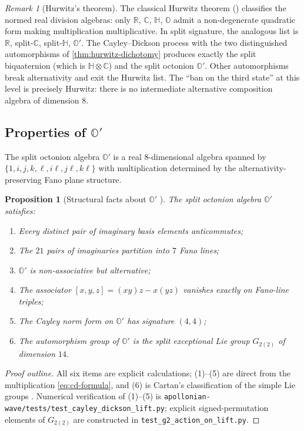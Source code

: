 \documentclass[11pt,a4paper]{article}
\theoremstyle{plain}
\newtheorem{proposition}[theorem]{Proposition}
\theoremstyle{definition}
\theoremstyle{remark}
\newtheorem{remark}[theorem]{Remark}
\numberwithin{equation}{section}
\providecommand{\R}{\mathbb{R}}
\providecommand{\C}{\mathbb{C}}
\providecommand{\HH}{\mathbb{H}}
\providecommand{\OO}{\mathbb{O}}
\providecommand{\Os}{\mathbb{O}'}
\begin{document}
\begin{remark}[Hurwitz's theorem]
\label{rmk:hurwitz}
The classical Hurwitz theorem (\cite{hurwitz1898,baez-octonions})
classifies the normed real division algebras: only $\R$, $\C$,
$\HH$, $\OO$ admit a non-degenerate quadratic form making
multiplication multiplicative.  In split signature, the analogous
list is $\R$, split-$\C$, split-$\HH$, $\Os$.  The
Cayley--Dickson process with the two distinguished automorphisms
of \cref{thm:hurwitz-dichotomy} produces exactly the split
biquaternion (which is $\HH \otimes \C$) and the split octonion
$\Os$.  Other automorphisms break alternativity and exit the
Hurwitz list.  The ``ban on the third state'' at this level is
precisely Hurwitz: there is no intermediate alternative
composition algebra of dimension $8$.
\end{remark}

\subsection{Properties of \texorpdfstring{$\Os$}{O'}}

The split octonion algebra $\Os$ is a real $8$-dimensional algebra
spanned by $\{1, i, j, k, \ell, i\ell, j\ell, k\ell\}$ with
multiplication determined by the alternativity-preserving Fano
plane structure.

\begin{proposition}[Structural facts about $\Os$
{\cite[\S4]{cd-lift}}]
\label{prop:O-prime-facts}
The split octonion algebra $\Os$ satisfies:
\begin{enumerate}[label=\textnormal{(\arabic*)}]
  \item Every distinct pair of imaginary basis elements
    anticommutes;
  \item The $21$ pairs of imaginaries partition into $7$ Fano
    lines;
  \item $\Os$ is non-associative but alternative;
  \item The associator $[x, y, z] = (xy)z - x(yz)$ vanishes
    exactly on Fano-line triples;
  \item The Cayley norm form on $\Os$ has signature $(4, 4)$;
  \item The automorphism group of $\Os$ is the split exceptional
    Lie group $G_{2(2)}$ of dimension $14$.
\end{enumerate}
\end{proposition}

\begin{proof}[Proof outline]
All six items are explicit calculations; (1)--(5) are direct
from the multiplication \eqref{eq:cd-formula}, and (6) is
Cartan's classification of the simple Lie groups
\cite{cartan1894,jacobson1958}.  Numerical verification of (1)--(5)
is \texttt{apollonian-wave/tests/test\_cayley\_dickson\_lift.py};
explicit signed-permutation elements of $G_{2(2)}$ are
constructed in \texttt{test\_g2\_action\_on\_lift.py}.
\end{proof}
\end{document}
